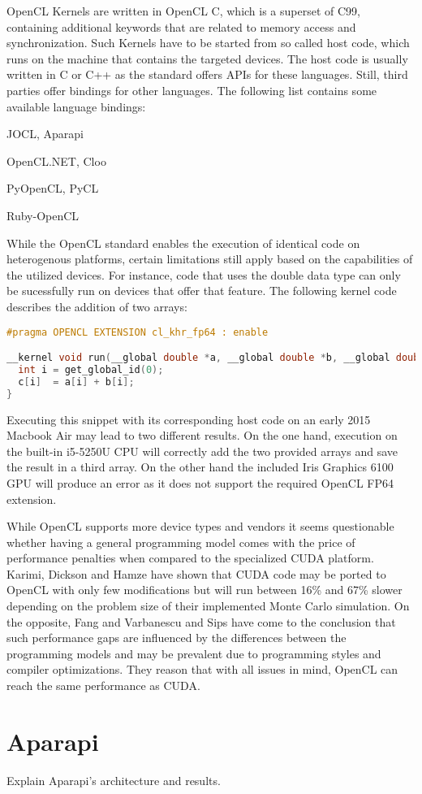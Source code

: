 OpenCL Kernels are written in OpenCL C, which is a superset of C99, containing additional keywords that are related to memory access and synchronization. Such Kernels have to be started from so called host code, which runs on the machine that contains the targeted devices. The host code is usually written in C or C++ as the standard offers APIs for these languages. Still, third parties offer bindings for other languages. The following list contains some available language bindings:

\begin{description}[align=left]
  \item [Java] JOCL, Aparapi
  \item [.NET] OpenCL.NET, Cloo
  \item [Python] PyOpenCL, PyCL
  \item [Ruby] Ruby-OpenCL
\end{description}

While the OpenCL standard enables the execution of identical code on heterogenous platforms, certain limitations still apply based on the capabilities of the utilized devices. For instance, code that uses the double data type can only be sucessfully run on devices that offer that feature. The following kernel code describes the addition of two arrays:

\begin{lstlisting}[language=C++]
#pragma OPENCL EXTENSION cl_khr_fp64 : enable

__kernel void run(__global double *a, __global double *b, __global double *c){
  int i = get_global_id(0);
  c[i]  = a[i] + b[i];
}
\end{lstlisting}

Executing this snippet with its corresponding host code on an early 2015 Macbook Air may lead to two different results. On the one hand, execution on the built-in i5-5250U CPU will correctly add the two provided arrays and save the result in a third array. On the other hand the included Iris Graphics 6100 GPU will produce an error as it does not support the required OpenCL FP64 extension.

While OpenCL supports more device types and vendors it seems questionable whether having a general programming model comes with the price of performance penalties when compared to the specialized CUDA platform. Karimi, Dickson and Hamze have shown that CUDA code may be ported to OpenCL with only few modifications but will run between 16\% and 67\% slower depending on the problem size of their implemented Monte Carlo simulation\cite{performance_comparison}. On the opposite, Fang and Varbanescu and Sips have come to the conclusion that such performance gaps are influenced by the differences between the programming models and may be prevalent due to programming styles and compiler optimizations\cite{comprehensive_performance_comparison}. They reason that with all issues in mind, OpenCL can reach the same performance as CUDA.

\section{Aparapi}

Explain Aparapi's architecture and results.
